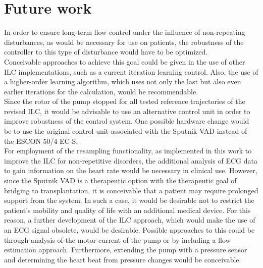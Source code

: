 \section{Future work}
In order to ensure long-term flow control under the influence of non-repeating disturbances, as would be necessary for use on patients, the robustness of the controller to this type of disturbance would have to be optimized.
\\Conceivable approaches to achieve this goal could be given in the use of other ILC implementations, such as a current iteration learning control. Also, the use of a higher-order learning algorithm, which uses not only the last but also even earlier iterations for the calculation, would be recommendable.
\\Since the rotor of the pump stopped for all tested reference trajectories of the revised ILC, it would be advisable to use an alternative control unit in order to improve robustness of the control system. One possible hardware change would be to use the original control unit associated with the Sputnik VAD instead of the ESCON 50/4 EC-S.
\\For employment of the resampling functionality, as implemented in this work to improve the ILC for non-repetitive disorders, the additional analysis of ECG data to gain information on the heart rate would be necessary in clinical use. However, since the Sputnik VAD is a therapeutic option with the therapeutic goal of bridging to transplantation, it is conceivable that a patient may require prolonged support from the system. In such a case, it would be desirable not to restrict the patient's mobility and quality of life with an additional medical device. For this reason, a further development of the ILC approach, which would make the use of an ECG signal obsolete, would be desirable.
Possible approaches to this could be through analysis of the motor current of the pump or by including a flow estimation approach. Furthermore, extending the pump with a pressure sensor and determining the heart beat from pressure changes would be conceivable.
